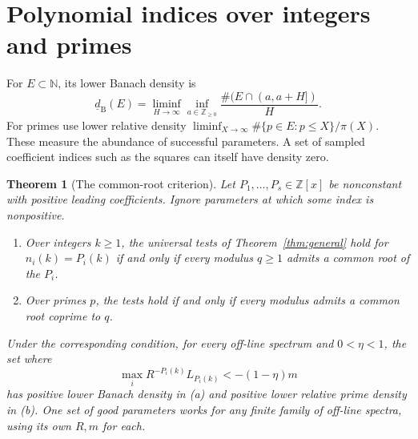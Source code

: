 \documentclass[11pt,letterpaper]{article}
\newtheorem{theorem}{Theorem}
\newcommand{\Z}{\mathbb Z}
\newcommand{\N}{\mathbb N}
\newcommand{\dc}{\underline d_{\mathrm B}}
\begin{document}
\section{Polynomial indices over integers and primes}
For \(E\subset\N\), its lower Banach density is
\[
 \dc(E)=\liminf_{H\to\infty}\inf_{a\in\Z_{\ge0}}
       \frac{\#(E\cap(a,a+H])}{H}.
\]
For primes use lower relative density
\(\liminf_{X\to\infty}\#\{p\in E:p\le X\}/\pi(X)\).
These measure the abundance of successful parameters. A set of sampled coefficient indices such as the squares can itself have density zero.
\begin{theorem}[The common-root criterion]\label{thm:poly}
Let \(P_1,\ldots,P_s\in\Z[x]\) be nonconstant with positive leading coefficients. Ignore parameters at which some index is nonpositive.
\begin{enumerate}[label=\textup{(\alph*)}]
\item Over integers \(k\ge1\), the universal tests of Theorem~\ref{thm:general} hold for \(n_i(k)=P_i(k)\) if and only if every modulus \(q\ge1\) admits a common root of the \(P_i\).
\item Over primes \(p\), the tests hold if and only if every modulus admits a common root coprime to \(q\).
\end{enumerate}
Under the corresponding condition, for every off-line spectrum and \(0<\eta<1\), the set where
\[
 \max_i R^{-P_i(k)} L_{P_i(k)}<-(1-\eta)m
\]
has positive lower Banach density in \textup{(a)} and positive lower relative prime density in \textup{(b)}. One set of good parameters works for any finite family of off-line spectra, using its own \(R,m\) for each.
\end{theorem}
\end{document}
